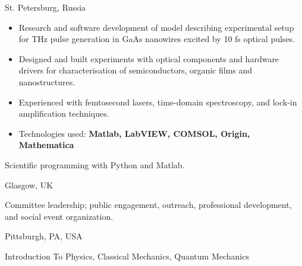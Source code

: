 \documentclass[10pt,a4paper,ragged2e,withhyper]{altacv}
\begin{document}
\begin{paracol}{2}
{St. Petersburg, Russia}

\begin{itemize}
    \item Research and software development of model describing experimental
    setup for THz pulse generation in GaAs nanowires excited by 10 fs
    optical pulses.

    \item Designed and built experiments with optical components and hardware
    drivers for characterisation of semiconductors, organic films and
    nanostructures.
    
    \item Experienced with femtosecond lasers, time-domain spectroscopy, and
    lock-in amplification techniques.

    \item Technologies used:
    {\bf Matlab, LabVIEW, COMSOL, Origin, Mathematica}
\end{itemize}



Scientific programming with Python and Matlab.

\divider

{Glasgow, UK}

Committee leadership;
public engagement, outreach, professional development, and social event
organization.


\divider

{Pittsburgh, PA, USA}

Introduction To Physics, Classical Mechanics, Quantum Mechanics


\end{paracol}
\end{document}
